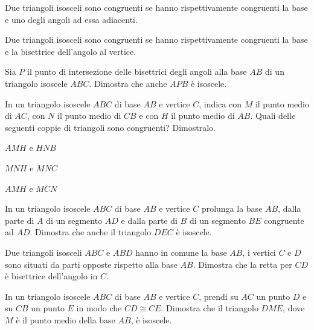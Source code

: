 \begin{multicols}{2}
\begin{esercizio}
\label{ese:2.31}
Due triangoli isosceli sono congruenti se hanno rispettivamente 
congruenti la base e uno degli angoli ad essa adiacenti.
\end{esercizio}

\begin{esercizio}
\label{ese:2.32}
Due triangoli isosceli sono congruenti se hanno rispettivamente 
congruenti la base e la bisettrice dell'angolo al vertice.
\end{esercizio}

\begin{esercizio}
\label{ese:2.34}
Sia \(P\) il punto di intersezione delle bisettrici degli angoli alla 
base \(AB\) di un triangolo isoscele \(ABC\). Dimostra che anche \(APB\) è 
isoscele.
\end{esercizio}

\begin{esercizio}
\label{ese:2.36}
In un triangolo isoscele \(ABC\) di base \(AB\) e vertice \(C\), indica con 
\(M\) il punto medio di \(AC\), con \(N\) il punto medio di \(CB\) e con \(H\) 
il punto medio di \(AB\). Quali delle seguenti coppie di triangoli sono 
congruenti? Dimostralo.
\begin{multicols}{2}
\begin{enumeratea}
\item \(AMH\) e \(HNB\)
\item \(MNH\) e \(MNC\)
\item \(AMH\) e \(MCN\)
\end{enumeratea}
\end{multicols}
\end{esercizio}

\begin{esercizio}
\label{ese:2.38}
In un triangolo isoscele \(ABC\) di base \(AB\) e vertice \(C\) prolunga la 
base \(AB\), dalla parte di \(A\) di un segmento \(AD\) e dalla parte di 
\(B\) di un segmento \(BE\) congruente ad \(AD\). Dimostra che anche il 
triangolo \(DEC\) è isoscele.
\end{esercizio}

\begin{esercizio}
\label{ese:2.40}
Due triangoli isosceli \(ABC\) e \(ABD\) hanno in comune la base \(AB\), i 
vertici \(C\) e \(D\) sono situati da parti opposte rispetto alla base 
\(AB\). Dimostra che la retta per \(CD\) è bisettrice dell'angolo in \(C\).
\end{esercizio}

\begin{esercizio}
\label{ese:2.45}
In un triangolo isoscele \(ABC\) di base \(AB\) e vertice \(C\), prendi su 
\(AC\) un punto \(D\) e su \(CB\) un punto \(E\) in modo che \(CD\cong CE\). 
Dimostra che il triangolo \(DME\), dove \(M\) è il punto medio della base 
\(AB\), è isoscele.
\end{esercizio}


\end{multicols}
